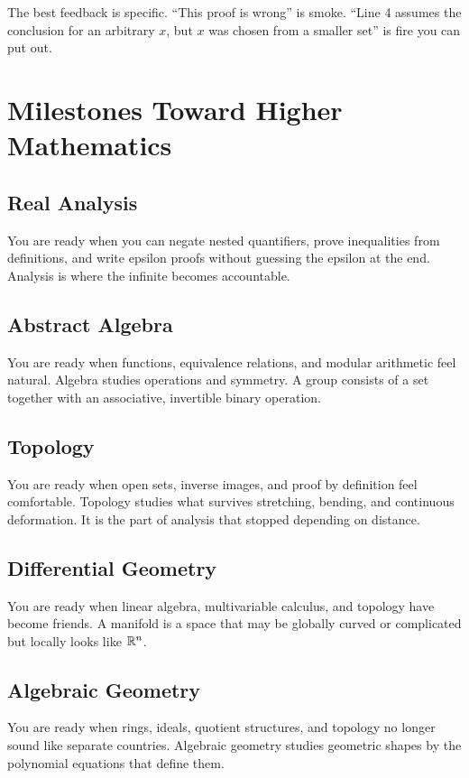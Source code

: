 \documentclass[11pt]{article}
\begin{document}
\begin{focusbox}
The best feedback is specific. ``This proof is wrong'' is smoke. ``Line 4 assumes the conclusion for an arbitrary $x$, but $x$ was chosen from a smaller set'' is fire you can put out.
\end{focusbox}

\section{Milestones Toward Higher Mathematics}

\subsection{Real Analysis}
You are ready when you can negate nested quantifiers, prove inequalities from definitions, and write epsilon proofs without guessing the epsilon at the end. Analysis is where the infinite becomes accountable.

\subsection{Abstract Algebra}
You are ready when functions, equivalence relations, and modular arithmetic feel natural. Algebra studies operations and symmetry. A group consists of a set together with an associative, invertible binary operation.

\subsection{Topology}
You are ready when open sets, inverse images, and proof by definition feel comfortable. Topology studies what survives stretching, bending, and continuous deformation. It is the part of analysis that stopped depending on distance.

\subsection{Differential Geometry}
You are ready when linear algebra, multivariable calculus, and topology have become friends. A manifold is a space that may be globally curved or complicated but locally looks like $\mathbb{R}^n$.

\subsection{Algebraic Geometry}
You are ready when rings, ideals, quotient structures, and topology no longer sound like separate countries. Algebraic geometry studies geometric shapes by the polynomial equations that define them.
\end{document}
